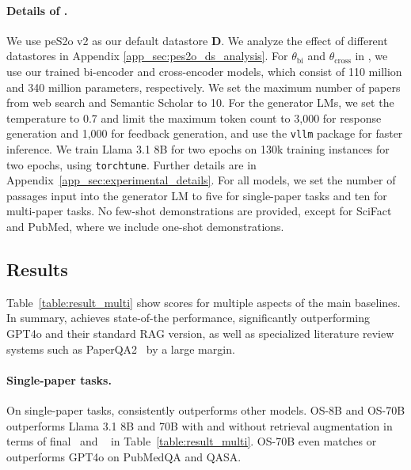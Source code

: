 \paragraph{Details of \model.}
We use peS2o v2 as our default datastore $\mathbf{D}$. We analyze the effect of different datastores in Appendix \ref{app_sec:pes2o_ds_analysis}. 
For $\theta_\text{bi}$ and $\theta_\text{cross}$ in \model, we use our trained bi-encoder and cross-encoder models, which consist of 110 million and 340 million parameters, respectively. We set the maximum number of papers from web search and Semantic Scholar to 10. 
For the generator LMs, we set the temperature to 0.7 and limit the maximum token count to 3,000 for response generation and 1,000 for feedback generation, and use the \texttt{vllm} package for faster inference. We train Llama 3.1 8B for two epochs on 130k training instances for two epochs, using \texttt{torchtune}.
Further details are in Appendix~\ref{app_sec:experimental_details}. 
For all models, we set the number of passages input into the generator LM to five for single-paper tasks and ten for multi-paper tasks. No few-shot demonstrations are provided, except for SciFact and PubMed, where we include one-shot demonstrations. 


\subsection{Results}
Table~\ref{table:result_multi} show scores for multiple aspects of the main baselines. 
In summary, \model achieves state-of-the performance, significantly outperforming GPT4o and their standard RAG version, as well as specialized literature review systems such as PaperQA2~\citep{skarlinski2024language} by a large margin. 


\paragraph{Single-paper tasks.} 
On single-paper tasks, \model consistently outperforms other models. OS-8B and OS-70B outperforms Llama 3.1 8B and 70B with and without retrieval augmentation in terms of final \acc~and \cit~ in Table~\ref{table:result_multi}. 
OS-70B even matches or outperforms GPT4o on PubMedQA and QASA. 

